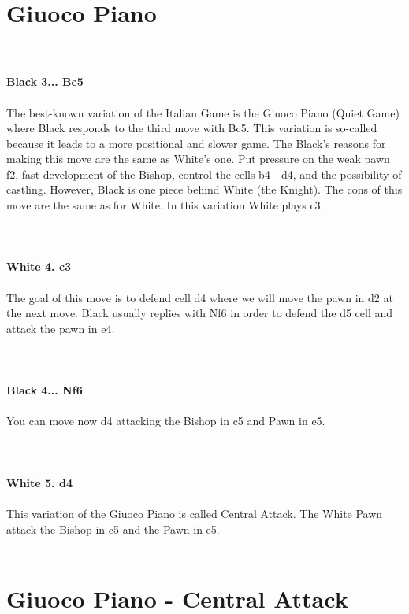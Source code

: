 \documentclass{article}
\begin{document}
\section{ Giuoco Piano}


\\
\\
\textbf{Black 3... Bc5}\\
\\
The best-known variation of the Italian Game is the Giuoco Piano (Quiet Game) where Black responds to the third move with Bc5. This variation is so-called because it leads to a more positional and slower game. The Black's reasons for making this move are the same as White's one. Put pressure on the weak pawn f2, fast development of the Bishop, control the cells b4 - d4, and the possibility of castling. However, Black is one piece behind White (the Knight). The cons of this move are the same as for White. In this variation White plays c3.\\
\\

\\
\\
\textbf{White 4. c3}\\
\\
The goal of this move is to defend cell d4 where we will move the pawn in d2 at the next move. Black usually replies with Nf6 in order to defend the d5 cell and attack the pawn in e4.\\
\\

\\
\\
\textbf{Black 4... Nf6}\\
\\
You can move now d4 attacking the Bishop in c5 and Pawn in e5.\\
\\

\\
\\
\textbf{White 5. d4}\\
\\
This variation of the Giuoco Piano is called Central Attack. The White Pawn attack the Bishop in c5 and the Pawn in e5.\\
\\
\section{ Giuoco Piano - Central Attack}
\end{document}
